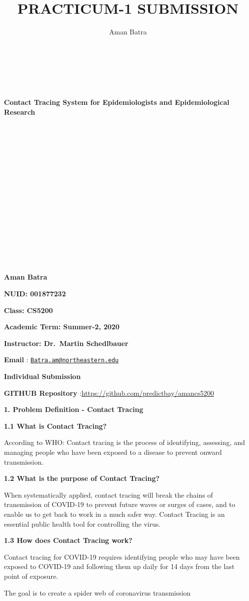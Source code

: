 \documentclass[
]{article}
\title{PRACTICUM-1 SUBMISSION}
\author{Aman Batra}
\date{}
\begin{document}
\maketitle

~

~

\textbf{Contact Tracing System for Epidemiologists and Epidemiological
Research}

~

~

~

~

~

~

~

~

~

\textbf{Aman Batra}

\textbf{NUID: 001877232}

\textbf{Class: CS5200}

\textbf{Academic Term: Summer-2, 2020}

\textbf{Instructor: Dr.~Martin Schedlbauer}

\textbf{Email} :
\href{mailto:Batra.am@northeastern.edu}{\nolinkurl{Batra.am@northeastern.edu}}

\textbf{Individual Submission}

\textbf{GITHUB Repository}
:\url{https://github.com/predictbay/amancs5200}

\textbf{1. Problem Definition - Contact Tracing}

\textbf{1.1 What is Contact Tracing?}

According to WHO: Contact tracing is the process of identifying,
assessing, and managing people who have been exposed to a disease to
prevent onward transmission.

\textbf{1.2 What is the purpose of Contact Tracing?}

When systematically applied, contact tracing will break the chains of
transmission of COVID-19 to prevent future waves or surges of cases, and
to enable us to get back to work in a much safer way. Contact Tracing is
an essential public health tool for controlling the virus.

\textbf{1.3 How does Contact Tracing work?}

Contact tracing for COVID-19 requires identifying people who may have
been exposed to COVID-19 and following them up daily for 14 days from
the last point of exposure.

The goal is to create a spider web of coronavirus transmission
\end{document}
